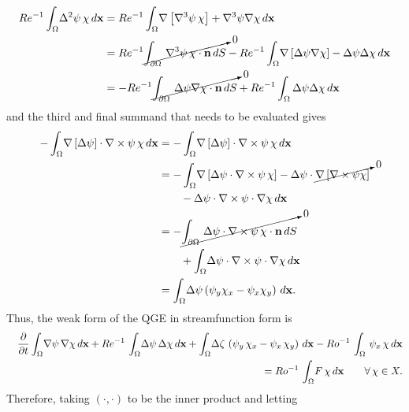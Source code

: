 \begin{align*}
  Re^{-1}\int_{\Omega}\! \Delta^2 \psi\, \chi \, d\mathbf{x} &= Re^{-1}\int_{\Omega}\! \nabla\left[
    \nabla^3 \psi \, \chi \right] + \nabla^3 \psi \nabla \chi \, d\mathbf{x} \\
  &= Re^{-1}\cancelto{0}{\int_{\partial\Omega}\, \nabla^3 \psi\, \chi\cdot \mathbf{n}
    \, dS} - Re^{-1}\int_{\Omega}\! \nabla\left[ \Delta\psi \nabla \chi \right] - \Delta
    \psi \Delta \chi \, d\mathbf{x} \\
  &= -Re^{-1} \cancelto{0}{\int_{\partial\Omega}\, \Delta\psi \nabla \chi \cdot
    \mathbf{n}\, dS} + Re^{-1} \int_{\Omega} \Delta \psi \Delta \chi \, d\mathbf{x}
\end{align*}
and the third and final summand that needs to be evaluated gives
\begin{align*}
  -\int_{\Omega}\! \nabla\left[ \Delta\psi\right]\cdot
    \nabla\times\psi \, \chi \, d\mathbf{x} &= -\int_{\Omega}\!
    \nabla\left[\Delta\psi\right]\cdot \nabla\times\psi \, \chi\, d\mathbf{x}\\
  &= -\int_{\Omega}\! \nabla\left[ \Delta\psi \cdot \nabla\times\psi\, \chi
    \right] -\Delta\psi\cdot \cancelto{0}{\nabla\left[ \nabla\times\psi \chi
    \right]} \\
      &\qquad - \Delta\psi\cdot \nabla\times\psi \cdot \nabla\chi \, d\mathbf{x} \\
  &= -\cancelto{0}{\int_{\partial\Omega}\, \Delta\psi \cdot \nabla\times\psi\, \chi
    \cdot \mathbf{n} \, dS} \\
    &\qquad + \int_{\Omega}\! \Delta \psi \cdot \nabla\times \psi \cdot
      \nabla \chi \, d\mathbf{x} \\
  &= \int_{\Omega}\! \Delta\psi\left( \psi_y\chi_x - \psi_x\chi_y \right)\, d\mathbf{x}.
\end{align*}
Thus, the weak form of the QGE in streamfunction form is
\begin{eqnarray}
  && \frac{\partial}{\partial t} \int_{\Omega}\! \nabla \psi\, \nabla \chi  \, d\mathbf{x}
    + Re^{-1} \, \int_{\Omega}\! \Delta \psi \, \Delta \chi \, d{\bf x} + \int_{\Omega}\! \Delta
    \zeta \, \left( \psi_y \, \chi_x - \psi_x \, \chi_y \right)\, d{\bf x} - Ro^{-1} \, \int_{\Omega}
    \, \psi_x \, \chi \, d{\bf x} \nonumber \\
  && \hspace*{3.0cm} = Ro^{-1}\, \int_{\Omega}\! F \, \chi \, d{\bf x} \qquad \forall \, \chi \in X .
\label{eqn:qge_psi_weak}
\end{eqnarray}
Therefore, taking $(\cdot,\cdot)$ to be the inner product and letting
